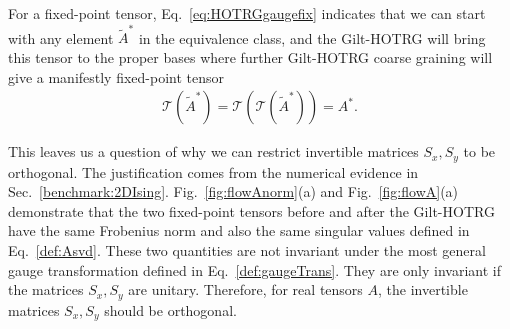 \documentclass[aps,prb,reprint,superscriptaddress,floatfix]{revtex4-2}
\begin{document}
For a fixed-point tensor, Eq.~\eqref{eq:HOTRGgaugefix} indicates that we
can start with any element $\tilde{A}^*$ in the equivalence class, and
the Gilt-HOTRG will bring this tensor to the proper bases where further
Gilt-HOTRG coarse graining will give a manifestly fixed-point tensor
%
\begin{align}\label{eq:GiltHOTRGfixT}
    \mathcal{T}(\tilde{A}^*) =
    \mathcal{T}\left(\mathcal{T}(\tilde{A}^*)  \right) = A^*.
\end{align}
%

This leaves us a question of why we can restrict invertible matrices
$S_x, S_y$ to be orthogonal. The justification comes from the
numerical evidence in Sec.~\ref{benchmark:2DIsing}.
Fig.~\ref{fig:flowAnorm}(a) and Fig.~\ref{fig:flowA}(a) demonstrate
that the two fixed-point tensors before and after the Gilt-HOTRG
have the same Frobenius norm and also the same singular values defined
in Eq.~\eqref{def:Asvd}. These two quantities are not invariant under
the most general gauge transformation defined in
Eq.~\eqref{def:gaugeTrans}. They are only invariant if the matrices
$S_x,S_y$ are unitary. Therefore, for real tensors $A$, the invertible
matrices $S_x,S_y$ should be orthogonal.
%
\end{document}
